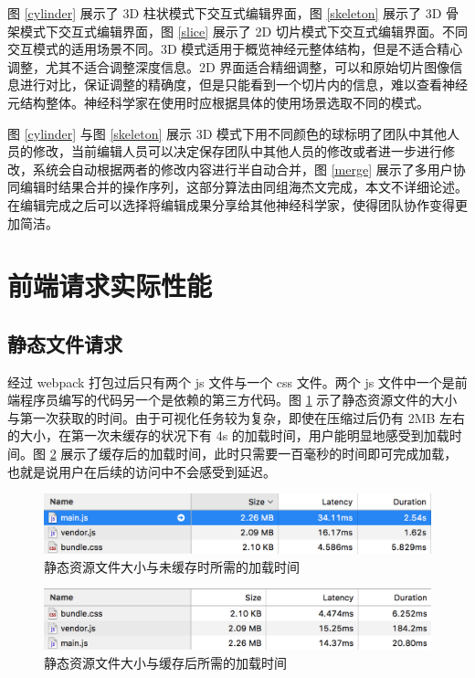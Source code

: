 图 \ref{cylinder} 展示了 3D 柱状模式下交互式编辑界面，图 \ref{skeleton} 展示了 3D 骨架模式下交互式编辑界面，图 \ref{slice} 展示了 2D 切片模式下交互式编辑界面。不同交互模式的适用场景不同。3D 模式适用于概览神经元整体结构，但是不适合精心调整，尤其不适合调整深度信息。2D 界面适合精细调整，可以和原始切片图像信息进行对比，保证调整的精确度，但是只能看到一个切片内的信息，难以查看神经元结构整体。神经科学家在使用时应根据具体的使用场景选取不同的模式。

图 \ref{cylinder} 与图 \ref{skeleton} 展示 3D 模式下用不同颜色的球标明了团队中其他人员的修改，当前编辑人员可以决定保存团队中其他人员的修改或者进一步进行修改，系统会自动根据两者的修改内容进行半自动合并，图 \ref{merge} 展示了多用户协同编辑时结果合并的操作序列，这部分算法由同组海杰文完成，本文不详细论述。在编辑完成之后可以选择将编辑成果分享给其他神经科学家，使得团队协作变得更加简洁。

\section{前端请求实际性能}
\subsection{静态文件请求}
经过 webpack 打包过后只有两个 js 文件与一个 css 文件。两个 js 文件中一个是前端程序员编写的代码另一个是依赖的第三方代码。图 \ref{file-nocache} 示了静态资源文件的大小与第一次获取的时间。由于可视化任务较为复杂，即使在压缩过后仍有 2MB 左右的大小，在第一次未缓存的状况下有 4s 的加载时间，用户能明显地感受到加载时间。图 \ref{file-cache} 展示了缓存后的加载时间，此时只需要一百毫秒的时间即可完成加载，也就是说用户在后续的访问中不会感受到延迟。 

\begin{figure}[!ht]
\centering
\includegraphics[width=148mm]{images/file-nocache}
\caption{静态资源文件大小与未缓存时所需的加载时间}
\label{file-nocache}
\end{figure}

\begin{figure}[!ht]
\centering
\includegraphics[width=148mm]{images/file-cache}
\caption{静态资源文件大小与缓存后所需的加载时间}
\label{file-cache}
\end{figure}


